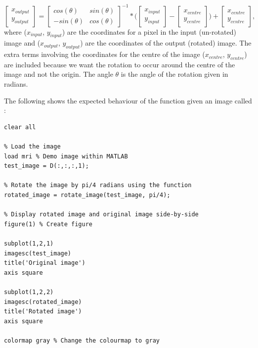 \begin{equation}
	\begin{bmatrix}
		x_{output} \\
		y_{output}	
	\end{bmatrix}	
	= 
	\begin{bmatrix}
		cos(\theta) & sin(\theta) \\
		-sin(\theta) & cos(\theta)
	\end{bmatrix}^{-1}
	*
	\Bigg(
	\begin{bmatrix}
		x_{input} \\
		y_{input}
	\end{bmatrix}
	-
	\begin{bmatrix}
		x_{centre} \\
		y_{centre}
	\end{bmatrix}
	\Bigg)
	+
	\begin{bmatrix}
		x_{centre} \\
		y_{centre}
	\end{bmatrix}
	,
\end{equation}
where ($x_{input}$, $y_{input}$) are the coordinates for a pixel in the input (un-rotated) image and ($x_{output}$, $y_{output}$) are the coordinates of the output (rotated) image.
The extra terms involving the coordinates for the centre of the image ($x_{centre}$, $y_{centre}$) are included because we want the rotation to occur around the centre of the image and not the origin. The angle $\theta$ is the angle of the rotation given in radians.

The following shows the expected behaviour of the function given an image called :

\begin{minipage}{\textwidth}
\begin{lstlisting}
clear all

% Load the image
load mri % Demo image within MATLAB
test_image = D(:,:,:,1);

% Rotate the image by pi/4 radians using the function
rotated_image = rotate_image(test_image, pi/4);

% Display rotated image and original image side-by-side
figure(1) % Create figure

subplot(1,2,1) 
imagesc(test_image)
title('Original image')
axis square

subplot(1,2,2)
imagesc(rotated_image)
title('Rotated image')
axis square

colormap gray % Change the colourmap to gray
\end{lstlisting}
\end{minipage}

